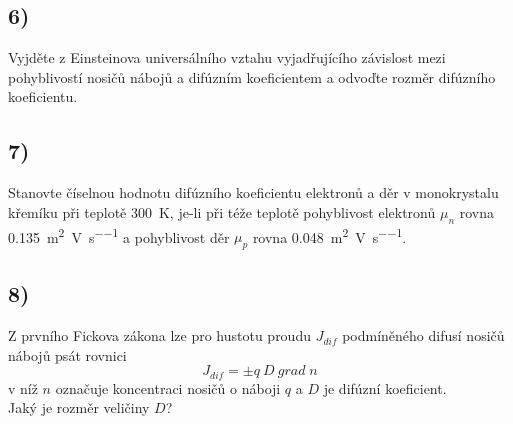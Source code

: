 \newpage


\subsection*{6)}

Vyjděte z Einsteinova universálního vztahu vyjadřujícího závislost mezi pohyblivostí nosičů nábojů a difúzním koeficientem a odvoďte rozměr difúzního koeficientu.

\newpage


\subsection*{7)}

Stanovte číselnou hodnotu difúzního koeficientu elektronů a děr v monokrystalu křemíku při teplotě \SI{300}{\kelvin}, je-li při téže teplotě pohyblivost elektronů $\mu_n$ rovna \SI{0,135}{\meter\squared\per\volt\per\second} a pohyblivost děr $\mu_p$ rovna \SI{0,048}{\meter\squared\per\volt\per\second}.

\newpage


\subsection*{8)}

Z prvního Fickova zákona lze pro hustotu proudu $J_{dif}$ podmíněného difusí nosičů nábojů psát rovnici
\begin{equation}
    J_{dif}=\pm q \ D \ grad \; n
\end{equation}
v níž $n$ označuje koncentraci nosičů o náboji $q$ a $D$ je difúzní koeficient. \\
Jaký je rozměr veličiny $D$?



